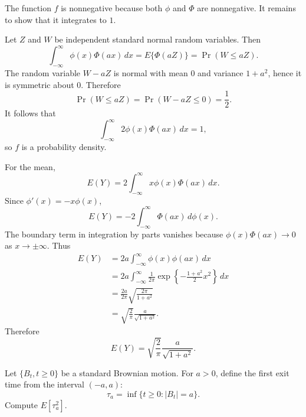 \begin{solution}
The function $f$ is nonnegative because both $\phi$ and $\Phi$ are nonnegative. It remains to show that it integrates to $1$.

Let $Z$ and $W$ be independent standard normal random variables. Then
\[
\int_{-\infty}^{\infty}\phi(x)\Phi(ax)\,dx
=E\{\Phi(aZ)\}
=\Pr(W\leq aZ).
\]
The random variable $W-aZ$ is normal with mean $0$ and variance $1+a^2$, hence it is symmetric about $0$. Therefore
\[
\Pr(W\leq aZ)=\Pr(W-aZ\leq 0)=\frac{1}{2}.
\]
It follows that
\[
\int_{-\infty}^{\infty}2\phi(x)\Phi(ax)\,dx=1,
\]
so $f$ is a probability density.

For the mean,
\[
E(Y)=2\int_{-\infty}^{\infty}x\phi(x)\Phi(ax)\,dx.
\]
Since $\phi'(x)=-x\phi(x)$,
\[
E(Y)=-2\int_{-\infty}^{\infty}\Phi(ax)\,d\phi(x).
\]
The boundary term in integration by parts vanishes because $\phi(x)\Phi(ax)\to 0$ as $x\to\pm\infty$. Thus
\[
\begin{aligned}
E(Y)
&=2a\int_{-\infty}^{\infty}\phi(x)\phi(ax)\,dx\\
&=2a\int_{-\infty}^{\infty}
\frac{1}{2\pi}\exp\left\{-\frac{1+a^2}{2}x^2\right\}\,dx\\
&=\frac{2a}{2\pi}\sqrt{\frac{2\pi}{1+a^2}}\\
&=\sqrt{\frac{2}{\pi}}\frac{a}{\sqrt{1+a^2}}.
\end{aligned}
\]
Therefore
\[
\boxed{E(Y)=\sqrt{\frac{2}{\pi}}\frac{a}{\sqrt{1+a^2}}.}
\]
\end{solution}

\begin{exercise}\label{probability:2026:4}
Let $\{B_t,t\geq 0\}$ be a standard Brownian motion. For $a>0$, define the first exit time from the interval $(-a,a)$:
\[
\tau_a=\inf\{t\geq 0:|B_t|=a\}.
\]
Compute $E[\tau_a^2]$.
\end{exercise}

